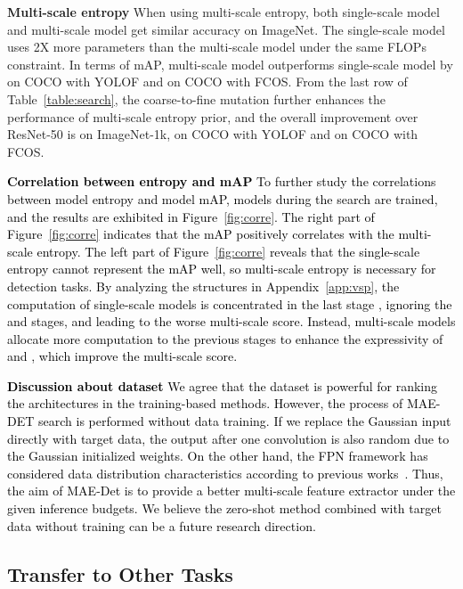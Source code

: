 \documentclass[nohyperref]{article}
\theoremstyle{plain}
\theoremstyle{definition}
\theoremstyle{remark}
\begin{document}
\noindent\textbf{Multi-scale entropy} When using multi-scale entropy, both single-scale model and multi-scale model get similar accuracy on ImageNet. The single-scale model uses 2X more parameters than the multi-scale model under the same FLOPs constraint. In terms of mAP, multi-scale model outperforms single-scale model by  on COCO with YOLOF and  on COCO with FCOS. From the last row of Table~\ref{table:search}, the coarse-to-fine mutation further enhances the performance of multi-scale entropy prior, and the overall improvement over ResNet-50 is  on ImageNet-1k,  on COCO with YOLOF and  on COCO with FCOS.


\noindent\textcolor{black}{\textbf{Correlation between entropy and mAP} 
To further study the correlations between model entropy and model mAP, models during the search are trained, and the results are exhibited in Figure~\ref{fig:corre}. 
The right part of Figure~\ref{fig:corre} indicates that the mAP positively correlates with the multi-scale entropy.
The left part of Figure~\ref{fig:corre} reveals that the single-scale entropy cannot represent the mAP well, so multi-scale entropy is necessary for detection tasks.
By analyzing the structures in Appendix~\ref{app:vsp}, the computation of single-scale models is concentrated in the last stage , ignoring the  and  stages, and leading to the worse multi-scale score. Instead, multi-scale models allocate more computation to the previous stages to enhance the expressivity of  and , which improve the multi-scale score. 
}

\noindent\textcolor{black}{\textbf{Discussion about dataset} 
We agree that the dataset is powerful for ranking the architectures in the training-based methods. 
However, the process of MAE-DET search is performed without data training.
If we replace the Gaussian input directly with target data, the output after one convolution is also random due to the Gaussian initialized weights. On the other hand, the FPN framework has considered data distribution characteristics according to previous works~\cite{fpn,fcos,gfv2}. Thus, the aim of MAE-Det is to provide a better multi-scale feature extractor under the given inference budgets. We believe the zero-shot method combined with target data without training can be a future research direction.
}

\subsection{Transfer to Other Tasks}
\label{sub:transfer}
\end{document}

